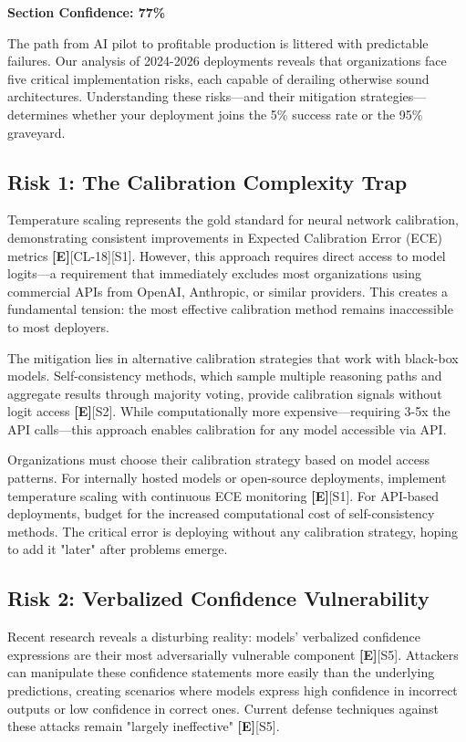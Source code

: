\documentclass[a4paper,11pt]{article}
\newcommand{\elabel}{\textbf{\textcolor{ecolor}{[E]}}}
\begin{document}
\textbf{Section Confidence: 77\%}\par

The path from AI pilot to profitable production is littered with predictable failures. Our analysis of 2024-2026 deployments reveals that organizations face five critical implementation risks, each capable of derailing otherwise sound architectures. Understanding these risks—and their mitigation strategies—determines whether your deployment joins the 5\% success rate or the 95\% graveyard.


\subsection{Risk 1: The Calibration Complexity Trap}

Temperature scaling represents the gold standard for neural network calibration, demonstrating consistent improvements in Expected Calibration Error (ECE) metrics \elabel{}[CL-18]\textcolor{primary}{[S1]}. However, this approach requires direct access to model logits—a requirement that immediately excludes most organizations using commercial APIs from OpenAI, Anthropic, or similar providers. This creates a fundamental tension: the most effective calibration method remains inaccessible to most deployers.


The mitigation lies in alternative calibration strategies that work with black-box models. Self-consistency methods, which sample multiple reasoning paths and aggregate results through majority voting, provide calibration signals without logit access \elabel{}\textcolor{primary}{[S2]}. While computationally more expensive—requiring 3-5x the API calls—this approach enables calibration for any model accessible via API.


Organizations must choose their calibration strategy based on model access patterns. For internally hosted models or open-source deployments, implement temperature scaling with continuous ECE monitoring \elabel{}\textcolor{primary}{[S1]}. For API-based deployments, budget for the increased computational cost of self-consistency methods. The critical error is deploying without any calibration strategy, hoping to add it "later" after problems emerge.


\subsection{Risk 2: Verbalized Confidence Vulnerability}

Recent research reveals a disturbing reality: models' verbalized confidence expressions are their most adversarially vulnerable component \elabel{}\textcolor{primary}{[S5]}. Attackers can manipulate these confidence statements more easily than the underlying predictions, creating scenarios where models express high confidence in incorrect outputs or low confidence in correct ones. Current defense techniques against these attacks remain "largely ineffective" \elabel{}\textcolor{primary}{[S5]}.
\end{document}

